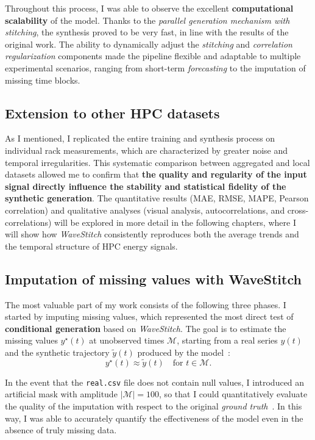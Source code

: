 Throughout this process, I was able to observe the excellent \textbf{computational scalability} of the model.  
Thanks to the \emph{parallel generation mechanism with stitching}, the synthesis proved to be very fast, in line with the results of the original work.  
The ability to dynamically adjust the \emph{stitching} and \emph{correlation regularization} components made the pipeline flexible and adaptable to multiple experimental scenarios, ranging from short-term \emph{forecasting} to the imputation of missing time blocks.

\subsection{Extension to other HPC datasets}

As I mentioned, I replicated the entire training and synthesis process on individual rack measurements, which are characterized by greater noise and temporal irregularities.  
This systematic comparison between aggregated and local datasets allowed me to confirm that \textbf{the quality and regularity of the input signal directly influence the stability and statistical fidelity of the synthetic generation}.  
The quantitative results (MAE, RMSE, MAPE, Pearson correlation) and qualitative analyses (visual analysis, autocorrelations, and cross-correlations) will be explored in more detail in the following chapters, where I will show how \emph{WaveStitch} consistently reproduces both the average trends and the temporal structure of HPC energy signals.

\subsection{Imputation of missing values with WaveStitch}

The most valuable part of my work consists of the following three phases.  
I started by imputing missing values, which represented the most direct test of \textbf{conditional generation} based on \emph{WaveStitch}.  
The goal is to estimate the missing values $y^{\star}(t)$ at unobserved times $\mathcal{M}$, starting from a real series $y(t)$ and the synthetic trajectory $\tilde{y}(t)$ produced by the model~\cite{box2015time,shumway2017time}:
\[
y^{\star}(t) \approx \tilde{y}(t) \quad \text{for } t \in \mathcal{M}.
\]

In the event that the \texttt{real.csv} file does not contain null values, I introduced an artificial mask with amplitude $|\mathcal{M}| = 100$, so that I could quantitatively evaluate the quality of the imputation with respect to the original \emph{ground truth}~\cite{little2019statistical}.  
In this way, I was able to accurately quantify the effectiveness of the model even in the absence of truly missing data.

